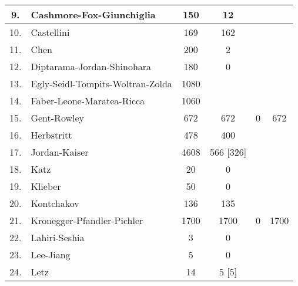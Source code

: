 \documentclass[runningheads]{llncs}
\begin{document}
\begin{table}
\begin{tabular}{c|l|c|c|c|c}
9. & Cashmore-Fox-Giunchiglia &  150 & 12 &  &  \\ \hline 

10. & Castellini &  169 & 162 &  &  \\ \hline

11. & Chen &  200 & 2 &  &  \\ \hline

12. & Diptarama-Jordan-Shinohara &  180 & 0 &  &  \\ \hline

13. & Egly-Seidl-Tompits-Woltran-Zolda &  1080 &  &  &  \\ \hline

14. & Faber-Leone-Maratea-Ricca &  1060 &  &  &  \\ \hline 

15. & Gent-Rowley &  672 & 672 & 0 & 672 \\ \hline

16. & Herbstritt &  478 & 400 &  &  \\ \hline

17. & Jordan-Kaiser &  4608 & 566 [326] &  &  \\\hline

18. & Katz &  20 & 0 &  &  \\ \hline

19. & Klieber & 50 & 0 &  &  \\ \hline

20. & Kontchakov&  136 & 135 &  &  \\ \hline

21. & Kronegger-Pfandler-Pichler &  1700 & 1700  & 0  & 1700 \\ \hline 

22. & Lahiri-Seshia & 3 & 0 &  &  \\ \hline

23. & Lee-Jiang &  5 &  0 &  &  \\ \hline

24. & Letz & 14 & 5 [5]  &  &  \\\hline


\end{tabular}
\end{table}
\end{document}
